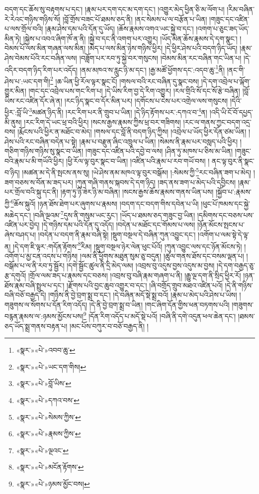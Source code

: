 བདག་དང་ཆོས་སུ་བརྟགས་པ་དང་། །རྣམ་པར་དག་དང་མ་དག་དང་། །འགྱུར་མེད་ཕྱིན་ཅི་མ་ལོག་པ། །རིམ་བཞིན་རེ་རེའང་གཉིས་གཉིས་སོ། །བློ་གྲོས་བཟང་པོ་ཐམས་ཅད་ནི། །ནང་སེམས་པ་ལ་བརྩོན་པ་ཡིན། །གཟུང་དང་འཛིན་པ་ལས་གྲོལ་བའི། །རྣམ་ཤེས་དམ་པའི་དོན་དུ་ཡོད། །ཆོས་རྣམས་འགའ་ཡང་སྐྱེ་བ་དང་། །འགག་པ་ཅུང་ཟད་ཡོད་མིན་ཏེ། །སྐྱེས་པ་འབའ་ཞིག་ཁོ་ན་ནི། །སྐྱེ་བ་དང་ནི་འགག་པར་འགྱུར། །ཡོད་མིན་ཆོས་རྣམས་དེ་དག་སྣང་། །བེམས་པོ་ལས་མིན་གཞན་ལས་མིན། །མེད་པ་ལས་མིན་ཉེས་གཉིས་ཕྱིར། །དེ་ཕྱིར་ཤེས་པའི་བདག་ཉིད་ཡོད། །རྣམ་ཤེས་བེམས་པོའི་རང་བཞིན་ལས། །བཟློག་པར་རབ་ཏུ་སྐྱེ་བར་གསུངས། །བེམས་མིན་རང་བཞིན་གང་ཡིན་པ། །དེ་འདིར་བདག་ཉིད་རིག་པར་འདོད། །ནམ་མཁའ་ས་རླུང་ཉི་མ་དང་། །རྒྱ་མཚོ་ཕྱོགས་དང་:འདབ་ཆུ་\footnote{«སྣར་»«པེ་»འབབ་ཆུ་}ནི། །ནང་གི་ཤེས་པ་:ཡང་དག་གི།\footnote{«སྣར་»«པེ་»ཡང་དག་གིས།} །ཆ་ཡིན་ཕྱི་རོལ་ལྟར་སྣང་ངོ། །གསལ་བའི་རང་བཞིན་དུ་སྣང་བས། །དེ་དག་འབྲེལ་པ་ལྐོག་གྱུར་མིན། །གང་དང་འབྲེལ་པས་གང་རིག་པ། །དེ་ཡིས་རིག་བྱ་དེ་རིག་འགྱུར། །རལ་གྲིའི་སོ་དང་སོ་རྩེ་བཞིན། །བློ་ཡིས་རང་འཛིན་དོར་ཞེ་ན། །རང་ཉིད་སྣང་བ་དོར་མིན་པར། །དགོངས་པ་ངེས་པར་འགྲེལ་ལས་གསུངས། །དེའི་ཕྱིར་:བློ་ཡི་\footnote{«སྣར་»«པེ་»བློ་ཡིས་}མཚན་ཉིད་ནི། །རང་རིག་པར་ནི་གྲུབ་པ་ཡིན། །དེ་ཉིད་རྟོགས་པར་:དཀའ་བ་\footnote{«སྣར་»«པེ་»དཀའ་བས་}ན། །འདི་ཡི་ངོ་བོ་དཔྱད་མི་ནུས། །རང་རིག་དེ་ཡང་ཕྲ་བའི་ཕྱིར། །སངས་རྒྱས་རྣམས་ཀྱིས་ཕྲ་བར་གཟིགས། །རང་ལ་གནས་ཀྱང་བདག་འདྲ་བས། །རྨོངས་པའི་ཕྱིར་ན་མཐོང་བ་མེད། །གསལ་དང་བློ་ནི་བདག་ཉིད་ཀྱིས། །འབྲེལ་པ་ཡོད་ཕྱིར་དོན་ཙམ་ཡིན། །ཤེས་པའི་རང་བཞིན་བདེན་པ་སྟེ། །རྣམ་པ་བརྫུན་ཞིང་འཁྲུལ་པ་ཡིན། །སེམས་ནི་རྣམ་པར་བསླད་པའི་ཕྱིར། །གཅིག་གཉིས་གཉིས་སུ་སྣང་བ་ཡིན། །གཟུང་དང་འཛིན་པའི་དབྱེ་བ་ལས། །ཤིན་ཏུ་མཁས་པ་ཅིས་མ་ཡིན། །གཟུང་བའི་རྣམ་པ་མི་གཡོའི་ཕྱིར། །ཕྱི་རོལ་ལྟ་བུར་སྣང་བ་ཡིན། །འཛིན་པའི་རྣམ་པ་རབ་གཡོ་བས། །
ནང་ལྟ་བུར་ནི་སྣང་བ་ཉིད། །མཚན་མ་དེ་ནི་སྤངས་ནས་སུ། །ཡེ་ཤེས་ནམ་མཁའ་ལྟ་བུར་བསྒོམ། །:སེམས་ཀྱི་\footnote{«སྣར་»«པེ་»སེམས་ཀྱིས་}རང་བཞིན་ཟག་པ་མེད། །ཟག་བཅས་ས་བོན་མ་ཟད་པར། །ཀུན་གཞི་གནས་སྐབས་དེ་དག་ཉིད། །ཟད་ནས་ཟག་པ་མེད་པའི་དབྱིངས། །རྣམ་པར་གྲོལ་བའི་སྐུ་དང་ནི། །རྟག་ཏུ་ཉི་ཟེར་ཉི་མ་བཞིན། །སངས་རྒྱས་ཆོས་རྣམས་གནས་ཡིན་པས། །སྐྱོབ་པ་:རྣམས་ཀྱི་\footnote{«སྣར་»«པེ་»རྣམས་ཀྱིས་}ཆོས་སྐུའོ། །ཉན་ཐོས་ཐེག་པར་ཞུགས་པ་རྣམས། །བདག་དང་བདག་གིས་དབེན་པ་ཡི། །ཕུང་པོ་ཁམས་དང་སྐྱེ་མཆེད་དང་། །བཞི་ལྔའམ་\footnote{«སྣར་»«པེ་»ལྔའང་}དུས་ནི་གསུམ་ཡང་རུང་། །ཡོད་པ་ཐམས་ཅད་གཟུང་བྱ་ཡིན། །དམིགས་དང་བཅས་པས་འཛིན་པར་བྱེད། །དེ་གཉིས་དམ་པའི་དོན་དུ་འདོད། །བདེན་པ་མཐོང་དང་གོམས་པ་ལས། །ཉོན་མོངས་སྤངས་པ་ཞེས་བཤད་པ། །བདེན་པ་བདག་ནི་རྣམ་བཞི་སྟེ། །སྡུག་བསྔལ་དེ་བཞིན་ཀུན་འབྱུང་དང་། །འགོག་པ་ལམ་སྟེ་དེ་ལྟ་ན། །དེ་དག་ཇི་ལྟར་:གདོན་རྟོགས་\footnote{«སྣར་»«པེ་»མངོན་རྟོགས་}རིམ། །སྡུག་བསྔལ་ཉེར་ལེན་ཕུང་པོའོ། །ཀུན་འབྱུང་ལས་དང་ཉོན་མོངས་ཏེ། །འགོག་པ་མྱ་ངན་འདས་པ་གཉིས། །ལམ་ནི་ཕྱོགས་མཐུན་སུམ་ཅུ་བདུན། །ཚུལ་གནས་ཐོས་དང་བསམ་ལྡན་པ། །བསྒོམ་པ་ལ་ནི་རབ་ཏུ་སྦྱོར། །དགེ་སྦྱོང་ཚུལ་ནི་དྲི་མེད་ལམ། །འབྲས་བུ་འདུས་བྱས་འདུས་མ་བྱས། །དེ་དག་བརྒྱད་ཅུ་རྩ་དགུའོ། །གྲོལ་ལམ་ཟད་པ་རྣམས་དང་བཅས། །འབྲས་བུ་བཞི་རྣམ་གཞག་པ་ནི། །རྒྱུ་ལྔ་དག་ནི་སྲིད་ཕྱིར་རོ། །ཉན་ཐོས་རྣམ་བཞི་སྤྲུལ་པ་དང་། །རྫོགས་པའི་བྱང་ཆུབ་འགྱུར་བ་དང་། །ཞི་བགྲོད་གྲུབ་མཐའ་འཛིན་པའོ། །དེ་ནི་གཉིས་བཞི་བཅོ་བརྒྱད་དེ། །གཉིས་ནི་བྱེ་བྲག་སྨྲ་བ་དང་། །དེ་བཞིན་མདོ་སྡེ་སྨྲ་བའོ། །རྣམ་པ་མེད་པའི་ཤེས་པ་ཡིས། །གཟུགས་ལ་སོགས་པ་དོན་རིག་འདོད། །དེ་ནི་བྱེ་བྲག་སྨྲ་བ་ཡིན། །གང་ཞིག་དོན་གྱིས་ཕན་བཏགས་པའི། །གཟུགས་བརྙན་རྣམས་ལ་:ཉམས་མྱོངས་པས།\footnote{«སྣར་»«པེ་»ཉམས་མྱོང་བས།} །དོན་རིག་འདོད་པ་མདོ་སྡེ་པའོ། །བཞི་ནི་དགེ་འདུན་ཕལ་ཆེན་དང་། །ཐམས་ཅད་ཡོད་སྨྲ་གནས་བརྟན་པ། །མང་པོས་བཀུར་བ་བཅོ་བརྒྱད་ནི། །
